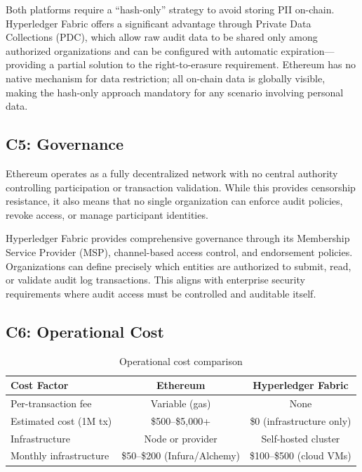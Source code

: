 \documentclass[12pt,a4paper]{article}
\begin{document}
Both platforms require a ``hash-only'' strategy to avoid storing PII on-chain. Hyperledger Fabric offers a significant advantage through Private Data Collections (PDC), which allow raw audit data to be shared only among authorized organizations and can be configured with automatic expiration---providing a partial solution to the right-to-erasure requirement. Ethereum has no native mechanism for data restriction; all on-chain data is globally visible, making the hash-only approach mandatory for any scenario involving personal data.

\subsection{C5: Governance}

Ethereum operates as a fully decentralized network with no central authority controlling participation or transaction validation. While this provides censorship resistance, it also means that no single organization can enforce audit policies, revoke access, or manage participant identities.

Hyperledger Fabric provides comprehensive governance through its Membership Service Provider (MSP), channel-based access control, and endorsement policies. Organizations can define precisely which entities are authorized to submit, read, or validate audit log transactions. This aligns with enterprise security requirements where audit access must be controlled and auditable itself.

\subsection{C6: Operational Cost}

\begin{table}[H]
\centering
\caption{Operational cost comparison}
\label{tab:cost}
\begin{tabular}{@{}lcc@{}}
\toprule
\textbf{Cost Factor} & \textbf{Ethereum} & \textbf{Hyperledger Fabric} \\
\midrule
Per-transaction fee     & Variable (gas)     & None \\
Estimated cost (1M tx)  & \$500--\$5,000+    & \$0 (infrastructure only) \\
Infrastructure          & Node or provider   & Self-hosted cluster \\
Monthly infrastructure  & \$50--\$200 (Infura/Alchemy) & \$100--\$500 (cloud VMs) \\
\bottomrule
\end{tabular}
\end{table}
\end{document}
